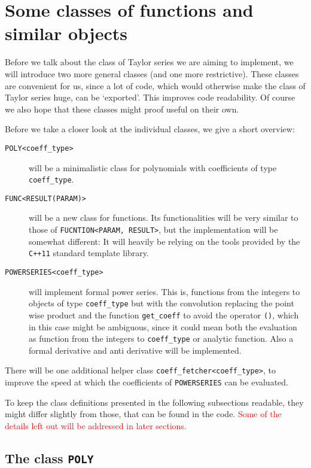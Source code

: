 \documentclass{article}
\newcommand{\ccOx}{\texttt{C++11}\xspace}
\newcommand{\ir}[1]{\texttt{#1}}
\newcommand{\code}[1]{\texttt{#1}}
\newcommand{\func}[1]{\texttt{#1}}
\newcommand{\temp}[1]{\textcolor{red}{#1}}
\begin{document}
\section{Some classes of functions and similar objects}

Before we talk about the class of Taylor series we are aiming to implement, we will introduce two more general classes (and one more restrictive). These classes are convenient for us, since a lot of code, which would otherwise make the class of Taylor series huge, can be \lq exported\rq. This improves code readability. Of course we also hope that these classes might proof useful on their own.

Before we take a closer look at the individual classes, we give a short overview:
\begin{description}
\item[\func{POLY<coeff\_type>}] will be a minimalistic class for polynomials with coefficients of type \code{coeff\_type}.
\item[\func{FUNC<RESULT(PARAM)>}] will be a new class for functions. Its functionalities will be very similar to those of \ir{FUCNTION<PARAM, RESULT>}, but the implementation will be somewhat different: It will heavily be relying on the tools provided by the \ccOx standard template library.
\item[\func{POWERSERIES<coeff\_type>}] will implement formal power series. This is, functions from the integers to objects of type \code{coeff\_type} but with the convolution replacing the point wise product and the function \code{get\_coeff} to avoid the operator \code{()}, which in this case might be ambiguous, since it could mean both the evaluation as function from the integers to \code{coeff\_type} or analytic function. Also a formal derivative and anti derivative will be implemented.
\end{description}

There will be one additional helper class \func{coeff\_fetcher<coeff\_type>}, to improve the speed at which the coefficients of \func{POWERSERIES} can be evaluated.

To keep the class definitions presented in the following subsections readable, they might differ slightly from those, that can be found in the code. \temp{Some of the details left out will be addressed in later sections.}

\subsection{The class \func{POLY}}
\end{document}
